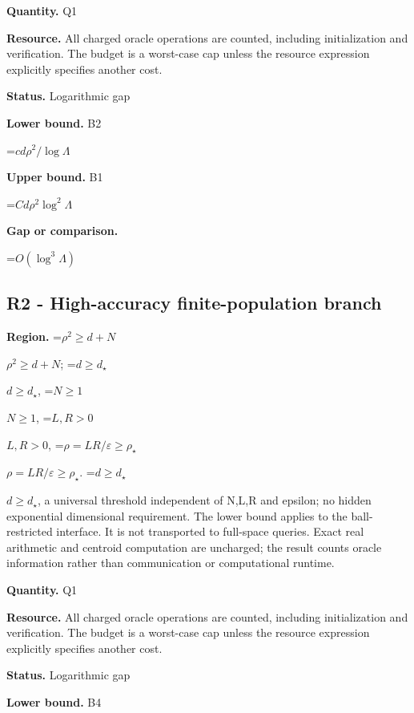 \documentclass[10pt,a4paper]{article}
\newcommand{\AtlasMath}[1]{\par\begingroup\centering\setbox0=\hbox{$\displaystyle #1$}\ifdim\wd0>1.4\linewidth\typeout{ATLAS WIDE FORMULA: \the\wd0}\fi\ifdim\wd0>\linewidth\resizebox{\linewidth}{!}{\box0}\else\box0\fi\par\endgroup}
\newcommand{\AtlasInlineMath}[1]{\begingroup\setbox0=\hbox{$#1$}\ifdim\wd0>.4\linewidth\endgroup\AtlasMath{#1}\else\endgroup$#1$\fi}
\begin{document}
\textbf{Quantity.} Q1



\textbf{Resource.} All charged oracle operations are counted, including initialization and verification. The budget is a worst-case cap unless the resource expression explicitly specifies another cost.



\textbf{Status.} Logarithmic gap



\textbf{Lower bound.} B2



\AtlasMath{cd\rho^2/\log\Lambda}


\textbf{Upper bound.} B1



\AtlasMath{Cd\rho^2\log^2\Lambda}


\textbf{Gap or comparison.}



\AtlasMath{O(\log^3\Lambda)}


\subsection{R2 - High-accuracy finite-population branch}


\textbf{Region.} \AtlasInlineMath{\rho^2\ge d+N}; \AtlasInlineMath{d\ge d_\star}, \AtlasInlineMath{N\ge1}, \AtlasInlineMath{L,R>0}, \AtlasInlineMath{\rho=LR/\varepsilon\ge\rho_\star}. \AtlasInlineMath{d\ge d_\star}, a universal threshold independent of N,L,R and epsilon; no hidden exponential dimensional requirement. The lower bound applies to the ball-restricted interface. It is not transported to full-space queries. Exact real arithmetic and centroid computation are uncharged; the result counts oracle information rather than communication or computational runtime.



\textbf{Quantity.} Q1



\textbf{Resource.} All charged oracle operations are counted, including initialization and verification. The budget is a worst-case cap unless the resource expression explicitly specifies another cost.



\textbf{Status.} Logarithmic gap



\textbf{Lower bound.} B4
\end{document}
